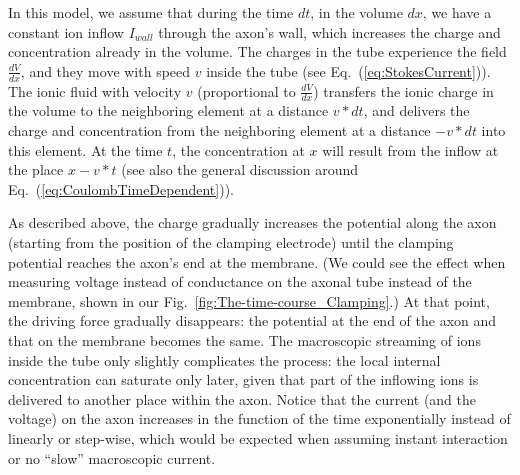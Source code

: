 In this model, we assume that during the time $dt$, in the volume
$dx$, we have a constant ion inflow $I_{wall}$ through the axon's
wall, which increases the charge and concentration already in the
volume. The charges in the tube experience the field $\frac{dV}{dx}$,
and they move with speed $v$ inside the tube (see Eq.~(\ref{eq:StokesCurrent})).
The ionic fluid with velocity $v$ (proportional
to $\frac{dV}{dx}$) transfers the ionic charge in
the volume to the neighboring element at a distance $v*dt$, and delivers
the charge and concentration from the neighboring element at a distance $-v*dt$ into
this element. At the time $t$, the concentration at $x$ will result
from the inflow at the place $x-v*t$ (see also the general discussion
around Eq.~(\ref{eq:CoulombTimeDependent})). 
%
%
%
%
%
%

As described above, the charge gradually increases the potential along
the axon (starting from the position of the clamping electrode) until
the clamping potential reaches the axon's end at the membrane. (We
could see the effect when measuring voltage instead of conductance
on the axonal tube instead of the membrane, shown in our Fig.~\ref{fig:The-time-course_Clamping}.)
At that point, the driving force gradually disappears: the potential
at the end of the axon and that on the membrane becomes the same.
The macroscopic streaming of ions inside the tube only slightly complicates
the process: the local internal concentration can saturate only later,
given that part of the inflowing ions is delivered to another place
within the axon. Notice that the current (and the voltage) on the
axon increases in the function of the time exponentially instead of
linearly or step-wise, which would be expected when assuming instant
interaction or no ``slow'' macroscopic current.


